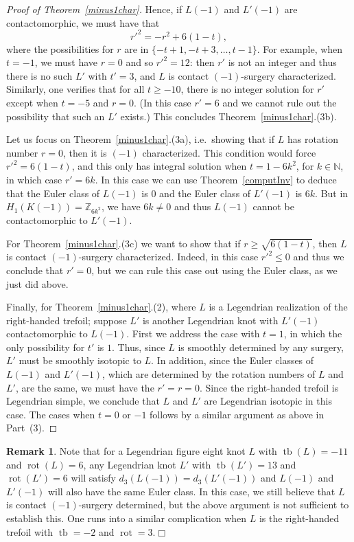 \documentclass[11pt]{amsart} %
\DeclareMathOperator{\tb}{tb}
\DeclareMathOperator{\rot}{rot}
\newcommand{\Z}{\mathbb{Z}}
\newcommand{\N}{\mathbb{N}}
\theoremstyle{plain}
\theoremstyle{definition}
\newtheorem{rem}[Theorem]{Remark}
\begin{document}
\begin{proof}[Proof of Theorem~\ref{minus1char}]
	Hence, if $L(-1)$ and $L'(-1)$ are contactomorphic, we must have that $${r'}^2=-r^2+6(1-t),$$ where the possibilities for $r$ are in $\{-t+1,-t+3, \ldots, t-1\}$. For example, when $t=-1$, we must have $r=0$ and so ${r'}^2=12$: then $r'$ is not an integer and thus there is no such $L'$ with $t'=3$, and $L$ is contact $(-1)$-surgery characterized. Similarly, one verifies that for all $t\geq -10$, there is no integer solution for $r'$ except when $t=-5$ and $r=0$. (In this case $r'=6$ and we cannot rule out the possibility that such an $L'$ exists.) This concludes Theorem~\ref{minus1char}.(3b). 
	
	Let us focus on Theorem~\ref{minus1char}.(3a), i.e.\ showing that if $L$ has rotation number $r=0$, then it is $(-1)$ characterized. This condition would force ${r'}^2=6(1-t)$, and this only has integral solution when $t=1-6k^2$, for $k\in\N$, in which case $r'=6k$. In this case we can use Theorem~\ref{computInv} to deduce that the Euler class of $L(-1)$ is $0$ and the Euler class of $L'(-1)$ is $6k$. But in $H_1(K(-1))=\Z_{6k^2}$, we have $6k\not=0$ and thus $L(-1)$ cannot be contactomorphic to $L'(-1)$. 
	
	For Theorem~\ref{minus1char}.(3c) we want to show that if $r\geq \sqrt{6(1-t)}$, then $L$ is contact $(-1)$-surgery characterized. Indeed, in this case ${r'}^2\leq 0$ and thus we conclude that $r'=0$, but we can rule this case out using the Euler class, as we just did above. 
	
	Finally, for Theorem~\ref{minus1char}.(2), where $L$ is a Legendrian realization of the right-handed trefoil; suppose $L'$ is another Legendrian knot with $L'(-1)$ contactomorphic to $L(-1)$. First we address the case with $t=1$, in which the only possibility for $t'$ is $1$. Thus, since $L$ is smoothly determined by any surgery, $L'$ must be smoothly isotopic to $L$. In addition, since the Euler classes of $L(-1)$ and $L'(-1)$, which are determined by the rotation numbers of $L$ and $L'$, are the same, we must have the $r'=r=0$. Since the right-handed trefoil is Legendrian simple, we conclude that $L$ and $L'$ are Legendrian isotopic in this case. The cases when $t=0$ or $-1$ follows by a similar argument as above in Part~(3). 
\end{proof}

\begin{rem}
	Note that for a Legendrian figure eight knot $L$ with $\tb(L)=-11$ and $\rot(L)=6$, any Legendrian knot $L'$ with $\tb(L')=13$ and $\rot(L')=6$ will satisfy $d_3(L(-1))=d_3(L'(-1))$ and $L(-1)$ and $L'(-1)$ will also have the same Euler class. In this case, we still believe that $L$ is contact $(-1)$-surgery determined, but the above argument is not sufficient to establish this. One runs into a similar complication when $L$ is the right-handed trefoil with $\tb=-2$ and $\rot=3$.\hfill$\Box$
\end{rem}
\end{document}
